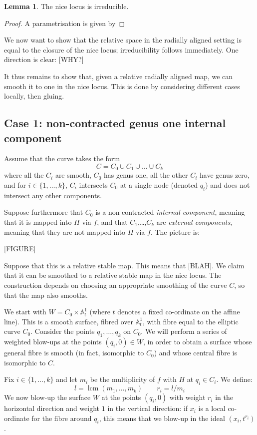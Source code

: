\documentclass[11pt]{amsart}
\newcommand{\Aaff}{\mathbb{A}}
\theoremstyle{definition}
\newtheorem{lem}[thm]{Lemma}
\theoremstyle{definition}
\begin{document}
\begin{lem}
The nice locus is irreducible.
\end{lem}
\begin{proof}
A parametrisation is given by
\end{proof}

We now want to show that the relative space in the radially aligned setting is equal to the closure of the nice locus; irreducibility follows immediately. One direction is clear: [WHY?]

It thus remains to show that, given a relative radially aligned map, we can smooth it to one in the nice locus. This is done by considering different cases locally, then gluing.

\subsection*{Case 1: non-contracted genus one internal component} Assume that the curve takes the form
\begin{equation*} C = C_0 \cup C_1 \cup \ldots \cup C_k \end{equation*}
where all the $C_i$ are smooth, $C_0$ has genus one, all the other $C_i$ have genus zero, and for $i \in \{1,\ldots,k\}$, $C_i$ intersects $C_0$ at a single node (denoted $q_i$) and does not intersect any other components.

Suppose furthermore that $C_0$ is a non-contracted \emph{internal component}, meaning that it is mapped into $H$ via $f$, and that $C_1$,\ldots,$C_k$ are \emph{external components}, meaning that they are not mapped into $H$ via $f$. The picture is:

[FIGURE]

Suppose that this is a relative stable map. This means that [BLAH]. We claim that it can be smoothed to a relative stable map in the nice locus. The construction depends on choosing an appropriate smoothing of the curve $C$, so that the map also smooths.

We start with $W = C_0 \times \Aaff^1_t$ (where $t$ denotes a fixed co-ordinate on the affine line). This is a smooth surface, fibred over $\Aaff^1_t$, with fibre equal to the elliptic curve $C_0$. Consider the points $q_1, \ldots, q_k$ on $C_0$. We will perform a series of weighted blow-ups at the points $(q_i,0) \in W$, in order to obtain a surface whose general fibre is smooth (in fact, isomorphic to $C_0$) and whose central fibre is isomorphic to $C$.

Fix $i \in \{1,\ldots,k\}$ and let $m_i$ be the multiplicity of $f$ with $H$ at $q_i \in C_i$. We define:
\begin{equation*} l = \operatorname{lcm}(m_1,\ldots,m_k) \qquad r_i = l/m_i \end{equation*}
We now blow-up the surface $W$ at the points $(q_i,0)$ with weight $r_i$ in the horizontal direction and weight $1$ in the vertical direction: if $x_i$ is a local co-ordinate for the fibre around $q_i$, this means that we blow-up in the ideal $(x_i,t^{r_i})$.
\end{document}
